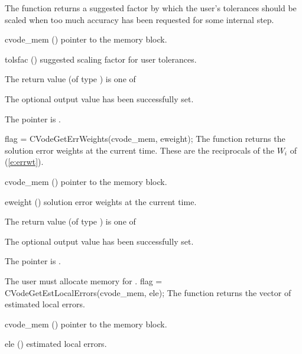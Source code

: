 {
  The function  returns a
  suggested factor by which the user's tolerances 
  should be scaled when too much accuracy has been 
  requested for some internal step.
}
{
  \begin{args}
  \item[cvode\_mem] ()
    pointer to the {\cvode} memory block.
  \item[tolsfac] ()
    suggested scaling factor for user tolerances.
  \end{args}
}
{
  The return value  (of type ) is one of
  \begin{args}
  \item[\Id{CV\_SUCCESS}] 
    The optional output value has been successfully set.
  \item[\Id{CV\_MEM\_NULL}]
    The  pointer is .
  \end{args}
}
{}
{
  flag = CVodeGetErrWeights(cvode\_mem, eweight);
}
{
  The function  returns the solution error weights 
  at the current time. These are the reciprocals of the $W_i$ of (\ref{e:errwt}).
}
{
  \begin{args}
  \item[cvode\_mem] ()
    pointer to the {\cvode} memory block.
  \item[eweight] ()
    solution error weights at the current time.
  \end{args}
}
{
  The return value  (of type ) is one of
  \begin{args}
  \item[\Id{CV\_SUCCESS}] 
    The optional output value has been successfully set.
  \item[\Id{CV\_MEM\_NULL}]
    The  pointer is .
  \end{args}
}
{
  {\warn} The user must allocate memory for .
}
{
  flag = CVodeGetEstLocalErrors(cvode\_mem, ele);
}
{
  The function  returns the
  vector of estimated local errors.
}
{
  \begin{args}
  \item[cvode\_mem] ()
    pointer to the {\cvode} memory block.
  \item[ele] ()
    estimated local errors.
  \end{args}
}
